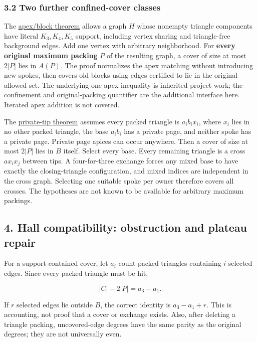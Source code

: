 \documentclass[11pt,a4paper]{article}
\begin{document}
\subsubsection{3.2 Two further confined-cover classes}\label{two-further-confined-cover-classes}

The \href{https://github.com/pappa211/ai-math-experiments/blob/main/problems/TUZA-18/notes/coordinator_pk_block_extension.md}{apex/block theorem} allows a graph \(H\) whose nonempty triangle components have literal \(K_3,K_4,K_5\) support, including vertex sharing and triangle-free background edges. Add one vertex with arbitrary neighborhood. For \textbf{every original maximum packing} \(P\) of the resulting graph, a cover of size at most \(2|P|\) lies in \(A(P)\). The proof normalizes the apex matching without introducing new spokes, then covers old blocks using edges certified to lie in the original allowed set. The underlying one-apex inequality is inherited project work; the confinement and original-packing quantifier are the additional interface here. Iterated apex addition is not covered.

The \href{https://github.com/pappa211/ai-math-experiments/blob/main/problems/TUZA-18/notes/criticality_private_tip_pk.md}{private-tip theorem} assumes every packed triangle is \(a_i b_i x_i\), where \(x_i\) lies in no other packed triangle, the base \(a_i b_i\) has a private page, and neither spoke has a private page. Private page apices can occur anywhere. Then a cover of size at most \(2|P|\) lies in \(B\) itself. Select every base. Every remaining triangle is a cross \(a x_i x_j\) between tips. A four-for-three exchange forces any mixed base to have exactly the closing-triangle configuration, and mixed indices are independent in the cross graph. Selecting one suitable spoke per owner therefore covers all crosses. The hypotheses are not known to be available for arbitrary maximum packings.

\subsection{4. Hall compatibility: obstruction and plateau repair}\label{hall-compatibility-obstruction-and-plateau-repair}

For a support-contained cover, let \(a_i\) count packed triangles containing \(i\) selected edges. Since every packed triangle must be hit,

\[|C|-2|P|=a_3-a_1.\]

If \(r\) selected edges lie outside \(B\), the correct identity is \(a_3-a_1+r\). This is accounting, not proof that a cover or exchange exists. Also, after deleting a triangle packing, uncovered-edge degrees have the same parity as the original degrees; they are not universally even.
\end{document}
